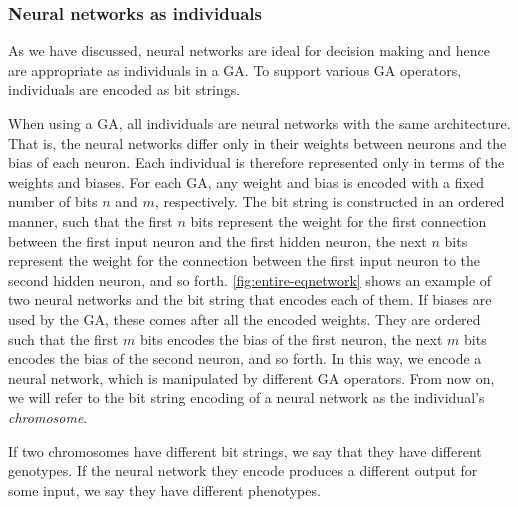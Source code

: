 \subsubsection{Neural networks as individuals}

As we have discussed, neural networks are ideal for decision making and hence are appropriate as individuals in a GA. To support various GA operators, individuals are encoded as bit strings.


When using a GA, all individuals are neural networks with the same architecture.
That is, the neural networks differ only in their weights between neurons and the bias of each neuron.
Each individual is therefore represented only in terms of the weights and biases.
For each GA, any weight and bias is encoded with a fixed number of bits $n$ and $m$, respectively.
The bit string is constructed in an ordered manner, such that the first $n$ bits represent the weight for the first connection between the first input neuron and the first hidden neuron, the next $n$ bits represent the weight for the connection between the first input neuron to the second hidden neuron, and so forth. \cref{fig:entire-eqnetwork} shows an example of two neural networks and the bit string that encodes each of them.
If biases are used by the GA, these comes after all the encoded weights.
They are ordered such that the first $m$ bits encodes the bias of the first neuron, the next $m$ bits encodes the bias of the second neuron, and so forth.
In this way, we encode a neural network, which is manipulated by different GA operators.
From now on, we will refer to the bit string encoding of a neural network as the individual's \emph{chromosome}.




%
If two chromosomes have different bit strings, we say that they have different genotypes. If the neural network they encode produces a different output for some input, we say they have different phenotypes.
